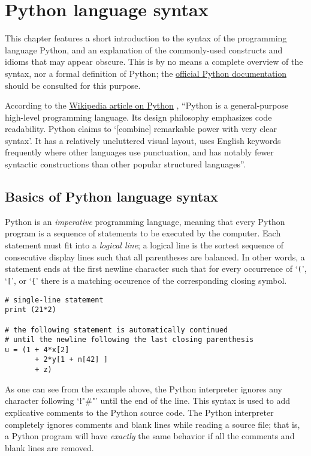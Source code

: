 
\chapter{Python language syntax}
\label{chap:python}

This chapter features a short introduction to the syntax of the
programming language Python, and an explanation of the commonly-used
constructs and idioms that may appear obscure.  This is by no means a
complete overview of the syntax, nor a formal definition of Python;
the \href{http://docs.python.org/3.1/}{official Python documentation}
\cite{python:docs, python:reference} should be consulted for this
purpose.

According to the
\href{http://en.wikipedia.org/wiki/Python_(programming_language)}
{Wikipedia article on Python} \cite{wikipedia:python}, ``Python is a
general-purpose high-level programming language. Its design philosophy
emphasizes code readability. Python claims to `[combine] remarkable
power with very clear syntax'. It has a relatively uncluttered visual
layout, uses English keywords frequently where other languages use
punctuation, and has notably fewer syntactic constructions than other
popular structured languages''.


\section{Basics of Python language syntax}
\label{sec:syntax}

Python is an \emph{imperative} programming language, meaning that
every Python program is a sequence of statements to be executed by the
computer.  Each statement must fit into a \emph{logical line}; a
logical line is the sortest sequence of consecutive display lines such
that all parentheses are balanced.  In other words, a statement ends
at the first newline character such that for every occurrence of
`\verb"("', `\verb"["', or `\verb"{"' there is a matching occurence of
  the corresponding closing symbol.
\begin{lstlisting}
# single-line statement
print (21*2)

# the following statement is automatically continued
# until the newline following the last closing parenthesis
u = (1 + 4*x[2] 
       + 2*y[1 + n[42] ]
       + z)
\end{lstlisting}
As one can see from the example above, the Python interpreter ignores
any character following `\l"#"' until the end of the line.  This
syntax is used to add explicative comments to the Python source code.
The Python interpreter completely ignores comments and blank lines
while reading a source file; that is, a Python program will have
\emph{exactly} the same behavior if all the comments and blank lines
are removed.

